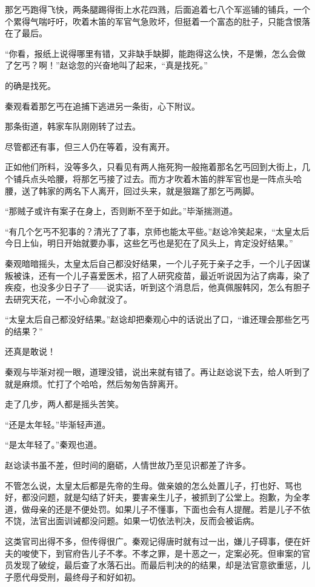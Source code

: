 那乞丐跑得飞快，两条腿踢得街上水花四溅，后面追着七八个军巡铺的铺兵，一个个累得气喘吁吁，吹着木笛的军官气急败坏，但挺着一个富态的肚子，只能含恨落在了最后。

“你看，报纸上说得哪里有错，又非缺手缺脚，能跑得这么快，不是懒，怎么会做了乞丐？啊！”赵谂忽的兴奋地叫了起来，“真是找死。”

的确是找死。

秦观看着那乞丐在追捕下逃进另一条街，心下附议。

那条街道，韩家车队刚刚转了过去。

尽管都还有事，但三人仍在等着，没有离开。

正如他们所料，没等多久，只看见有两人拖死狗一般拖着那名乞丐回到大街上，几个铺兵点头哈腰，将那乞丐接了过去。而方才吹着木笛的胖军官也是一阵点头哈腰，送了韩家的两名下人离开，回过头来，就是狠踹了那乞丐两脚。

“那贼子或许有案子在身上，否则断不至于如此。”毕渐揣测道。

“有几个乞丐不犯事的？清光了了事，京师也能太平些。”赵谂冷笑起来，“太皇太后今日上仙，明日开始就要办事，这些乞丐也是犯在了风头上，肯定没好结果。”

秦观暗暗摇头，太皇太后自己都没好结果，一个儿子死于亲子之手，一个儿子因谋叛被诛，还有一个儿子喜爱医术，招了人研究疫苗，最近听说因为沾了病毒，染了疾疫，也没多少日子了——说实话，听到这个消息后，他真佩服韩冈，怎么有胆子去研究天花，一不小心命就没了。

“太皇太后自己都没好结果。”赵谂却把秦观心中的话说出了口，“谁还理会那些乞丐的结果？”

还真是敢说！

秦观与毕渐对视一眼，道理没错，说出来就有错了。再让赵谂说下去，给人听到了就是麻烦。忙打了个哈哈，然后匆匆告辞离开。

走了几步，两人都是摇头苦笑。

“还是太年轻。”毕渐轻声道。

“是太年轻了。”秦观也道。

赵谂读书虽不差，但时间的磨砺，人情世故乃至见识都差了许多。

不管怎么说，太皇太后都是先帝的生母。做亲娘的怎么处置儿子，打也好、骂也好，都没问题，就是勾结了奸夫，要害亲生儿子，被抓到了公堂上。抱歉，为全孝道，做母亲的还是不便处罚。如果儿子不懂事，下面也会有人提醒。若是儿子不依不饶，法官出面训诫都没问题。如果一切依法判决，反而会被诟病。

这类官司出得不多，但传得很广。秦观记得唐时就有过一出，嫌儿子碍事，便在奸夫的唆使下，到官府告儿子不孝。不孝之罪，是十恶之一，定案必死。但审案的官员发现了破绽，最后查了水落石出。而最后判决的的结果，却是法官意欲重惩，儿子愿代母受刑，最终母子和好如初。

